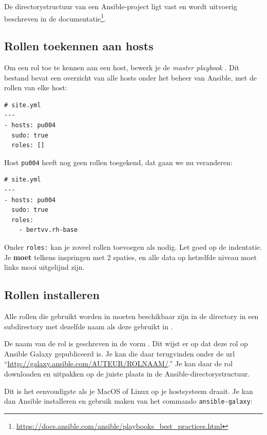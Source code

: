 De directorystructuur van een Ansible-project ligt vast en wordt uitvoerig beschreven in de documentatie\footnote{\url{https://docs.ansible.com/ansible/playbooks_best_practices.html}}.

\subsection{Rollen toekennen aan hosts}
\label{sub:rollen-toekennen-aan-hosts}

Om een rol toe te kennen aan een host, bewerk je de \emph{master playbook} . Dit bestand bevat een overzicht van alle hosts onder het beheer van Ansible, met de rollen van elke host:

\begin{verbatim}
# site.yml
---
- hosts: pu004
  sudo: true
  roles: []
\end{verbatim}

Host \texttt{pu004} heeft nog geen rollen toegekend, dat gaan we nu veranderen:

\begin{verbatim}
# site.yml
---
- hosts: pu004
  sudo: true
  roles:
    - bertvv.rh-base
\end{verbatim}

Onder \texttt{roles:} kan je zoveel rollen toevoegen als nodig. Let goed op de indentatie. Je \textbf{moet} telkens inspringen met 2 spaties, en alle data op hetzelfde niveau moet links mooi uitgelijnd zijn.

\subsection{Rollen installeren}
\label{sub:rollen-installeren}

Alle rollen die gebruikt worden in  moeten beschikbaar zijn in de directory  in een subdirectory met dezelfde naam als deze gebruikt in .

De naam van de rol  is geschreven in de vorm . Dit wijst er op dat deze rol op Ansible Galaxy gepubliceerd is. Je kan die daar terugvinden onder de url ``\url{http://galaxy.ansible.com/AUTEUR/ROLNAAM/}.'' Je kan daar de rol downloaden en uitpakken op de juiste plaats in de Ansible-directorystructuur.

Dit is het eenvoudigste als je MacOS of Linux op je hostsysteem draait. Je kan dan Ansible installeren en gebruik maken van het commando \texttt{ansible-galaxy}:

